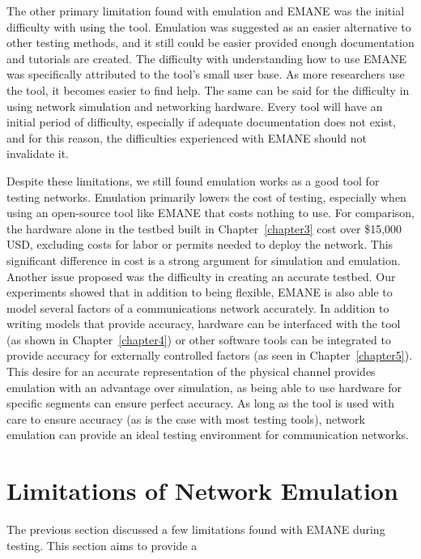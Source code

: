 The other primary limitation found with emulation and EMANE was the initial difficulty with using the tool.
Emulation was suggested as an easier alternative to other testing methods, and it still could be easier provided enough documentation and tutorials are created.
The difficulty with understanding how to use EMANE was specifically attributed to the tool's small user base.
As more researchers use the tool, it becomes easier to find help.
The same can be said for the difficulty in using network simulation and networking hardware.
Every tool will have an initial period of difficulty, especially if adequate documentation does not exist, and for this reason, the difficulties experienced with EMANE should not invalidate it.\par
Despite these limitations, we still found emulation works as a good tool for testing networks.
Emulation primarily lowers the cost of testing, especially when using an open-source tool like EMANE that costs nothing to use.
For comparison, the hardware alone in the testbed built in Chapter~\ref{chapter3} cost over \$15,000 USD, excluding costs for labor or permits needed to deploy the network.
This significant difference in cost is a strong argument for simulation and emulation.
Another issue proposed was the difficulty in creating an accurate testbed.
Our experiments showed that in addition to being flexible, EMANE is also able to model several factors of a communications network accurately.
In addition to writing models that provide accuracy, hardware can be interfaced with the tool (as shown in Chapter~\ref{chapter4}) or other software tools can be integrated to provide accuracy for externally controlled factors (as seen in Chapter~\ref{chapter5}).
This desire for an accurate representation of the physical channel provides emulation with an advantage over simulation, as being able to use hardware for specific segments can ensure perfect accuracy. 
As long as the tool is used with care to ensure accuracy (as is the case with most testing tools), network emulation can provide an ideal testing environment for communication networks.

\section{Limitations of Network Emulation}
The previous section discussed a few limitations found with EMANE during testing.
This section aims to provide a 


